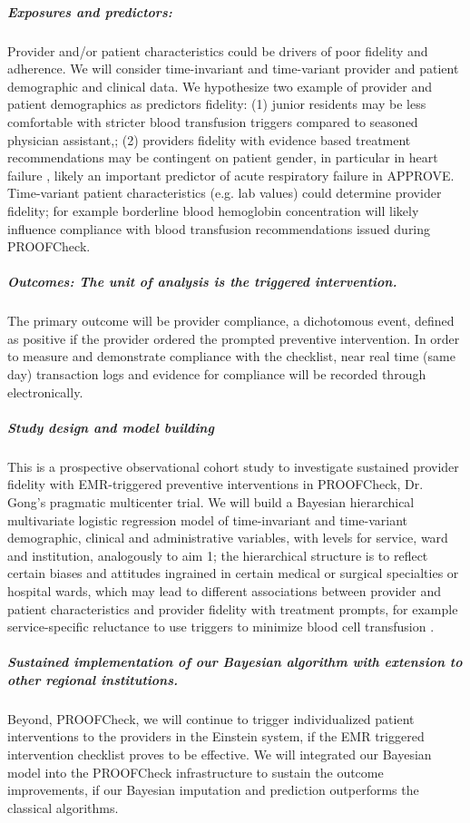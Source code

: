 \documentclass[11pt,notitlepage]{article}
\begin{document}
\subparagraph*{Exposures and predictors:}
Provider and/or patient characteristics could be drivers of poor fidelity and adherence. We will consider time-invariant and time-variant provider and patient demographic and clinical data. We hypothesize two example of provider and patient demographics as predictors fidelity: (1) junior residents may be less comfortable with stricter blood transfusion triggers compared to seasoned physician assistant,; (2) providers fidelity with evidence based treatment recommendations may be contingent on patient gender, in particular in heart failure \cite{Cook_25714825}, likely an important predictor of acute respiratory failure in APPROVE. Time-variant patient characteristics (e.g. lab values) could determine provider fidelity; for example borderline blood hemoglobin concentration will likely influence compliance with blood transfusion recommendations issued during PROOFCheck. 

\subparagraph*{Outcomes: The unit of analysis is the triggered intervention.}
The primary outcome will be provider compliance, a dichotomous event, defined as positive if the provider ordered the prompted preventive intervention. In order to measure and demonstrate compliance with the checklist, near real time (same day) transaction logs and evidence for compliance will be recorded through electronically.

\subparagraph*{Study design and model building}
This is a prospective observational cohort study to investigate sustained provider fidelity with EMR-triggered preventive interventions in PROOFCheck, Dr. Gong's pragmatic multicenter trial. We will build a Bayesian hierarchical multivariate logistic regression model of time-invariant and time-variant demographic, clinical  and administrative variables, with levels for service, ward and institution, analogously to aim 1; the hierarchical structure is to reflect certain biases and attitudes ingrained in certain medical or surgical specialties or hospital wards, which may lead to different associations between provider and patient characteristics and provider fidelity with treatment prompts, for example service-specific reluctance to use triggers to minimize blood cell transfusion \cite{Goodnough_23706801}. 


\subparagraph*{Sustained implementation of our Bayesian algorithm with extension to other regional institutions.} Beyond, PROOFCheck, we will continue to trigger individualized patient interventions to the providers in the Einstein system, if the EMR triggered intervention checklist proves to be effective. We will integrated our Bayesian model into the PROOFCheck infrastructure to sustain the outcome improvements, if our Bayesian imputation and prediction outperforms the classical algorithms.
\end{document}
